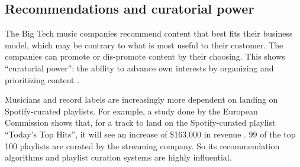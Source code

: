 \subsection{Recommendations and curatorial power}
The Big Tech music companies recommend content that best fits their business model, which may be contrary to what is most useful to their customer. The companies can promote or dis-promote content by their choosing. This shows ``curatorial power'': the ability to advance own interests by organizing and prioritizing content \citep{prey2020locating}.

Musicians and record labels are increasingly more dependent on landing on Spotify-curated playlists. For example, a study done by the European Commission shows that, for a track to land on the Spotify-curated playlist ``Today's Top Hits'', it will see an increase of \$163,000 in revenue \citep{aguiar2018platforms}. 99 of the top 100 playlists are curated by the streaming company. So its recommendation algorithms and playlist curation systems are highly influential. 

